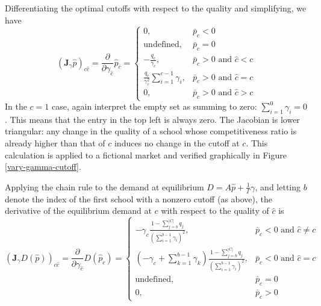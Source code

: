 \documentclass[12pt]{article}
\numberwithin{equation}{subsection}
\theoremstyle{definition}
\begin{document}
Differentiating the optimal cutoffs with respect to the quality and simplifying, we have
\begin{equation}\label{jac-gamma-p}
\left(\mathbf{J}_\gamma \hat p\right)_{c\hat c} =
\frac{\partial}{\partial\gamma_{\hat c}} \hat p_c = \begin{cases}
0, & \bar p_c < 0 \\
\text{undefined}, & \bar p_c = 0 \\
 - \frac{q_c}{\gamma_c}, & \bar p_c > 0 \text{ and }\hat c < c \\
\frac{q_c}{\gamma_c^2} \sum_{i=1}^{c-1} \gamma_i, & \bar p_c > 0 \text{ and }\hat c = c\\
0, & \bar p_c > 0 \text{ and }\hat c > c
\end{cases}
\end{equation}
In the $c=1$ case, again interpret the empty set as summing to zero: $\sum_{i=1}^{0} \gamma_i = 0$. This means that the entry in the top left is always zero. The Jacobian is lower triangular: any change in the quality of a school whose competitiveness ratio is already higher than that of $c$ induces no change in the cutoff at $c$. This calculation is applied to a fictional market and verified graphically in Figure \ref{vary-gamma-cutoff}.

Applying the chain rule to the demand at equilibrium $D = A \hat p + \frac{1}{\Gamma} \gamma$, and letting $b$ denote the index of the first school with a nonzero cutoff (as above), the derivative of the equilibrium demand at $c$ with respect to the quality of $\hat c$ is
\begin{equation} \label{jac-gamma-demand}
\left(\mathbf{J}_\gamma D\left(\hat p\right)\right)_{c\hat c} =
\frac{\partial}{\partial\gamma_{\hat c}} D(\hat p_c) = \begin{cases}
-\gamma_c \frac{1 - \sum_{j=b}^{|C|} q_j}{\left(\sum_{i=1}^{b-1} \gamma_i\right)^2}, & \bar p_c < 0 \text{ and }\hat c \neq c \\
\left(- \gamma_c + \sum_{k=1}^{b-1} \gamma_k\right)\frac{1 - \sum_{j=b}^{|C|} q_j}{\left(\sum_{i=1}^{b-1} \gamma_i\right)^2}, & \bar p_c < 0 \text{ and }\hat c = c\\
\text{undefined}, & \bar p_c = 0 \\
0, & \bar p_c > 0
\end{cases}
\end{equation}
\end{document}
